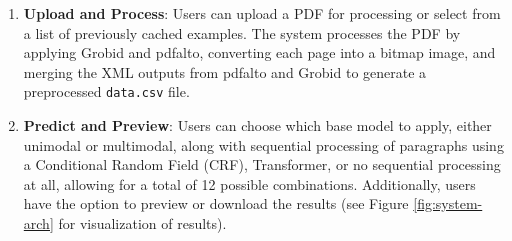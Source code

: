\documentclass[runningheads]{llncs}
\begin{document}
\begin{enumerate}
    \item \textbf{Upload and Process}: Users can upload a PDF for processing or select from a list of previously 
    cached examples. The system processes the PDF by applying Grobid and pdfalto, converting each page into a bitmap image, 
    and merging the XML outputs from pdfalto and Grobid to generate a preprocessed \texttt{data.csv} file.

    \item \textbf{Predict and Preview}: Users can choose which base model to apply, either unimodal or multimodal, along with 
    sequential processing of paragraphs using a Conditional Random Field (CRF), Transformer, or no sequential processing at all, 
    allowing for a total of 12 possible combinations. Additionally, users have the option to preview or download the results 
    (see Figure \ref{fig:system-arch} for visualization of results).


\end{enumerate}
\end{document}
